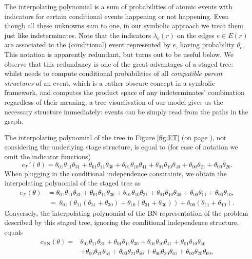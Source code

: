 {The interpolating polynomial is a sum of probabilities of atomic events with indicators for certain conditional events happening or not happening. Even though all these unknowns sum to one, in our symbolic approach we treat them just like indeterminates. Note that the indicators $\lambda_e(r)$ on the edges $e\in E(r)$ are associated to the (conditional) event represented by $e$, having probability $\theta_e$. This notation is apparently redundant, but turns out to be useful below. We observe that this redundancy is one of the great advantages of a staged tree: whilst \cite{Darwiche2003} needs to compute conditional probabilities of all \emph{compatible parent structures} of an event, which is a rather obscure concept in a symbolic framework, and \cite{Castillo1996a} computes the product space of any indeterminates' combination regardless of their meaning, a tree visualisation of our model gives us the necessary structure immediately: events can be simply read from the paths in the graph. 

\begin{example}
The interpolating polynomial of the tree in Figure \ref{fig:ET} (on page \pageref{riporto}), not considering the underlying stage structure, is equal to (for ease of notation we omit the indicator functions) 
\begin{equation}\label{eq:interpolstaged}
c_\mathcal{T}'(\theta)=\theta_{01}\theta_{11}\theta_{31}
+\theta_{01}\theta_{11}\theta_{30}
+\theta_{01}\theta_{10}\theta_{41}
+\theta_{01}\theta_{10}\theta_{40}
+\theta_{00}\theta_{21}
+\theta_{00}\theta_{20}.
\end{equation}
When plugging in the conditional independence constraints, we obtain the interpolating polynomial of the staged tree as
\begin{align}\label{eq:interpolceg}
c_\mathcal{T}(\theta)&=\theta_{01}\theta_{11}\theta_{31}
+\theta_{01}\theta_{11}\theta_{30}
+\theta_{01}\theta_{10}\theta_{31}
+\theta_{01}\theta_{10}\theta_{30}
+\theta_{00}\theta_{11}
+\theta_{00}\theta_{10},\\
&~=~\theta_{01}(\theta_{11}(\theta_{31}+\theta_{30})+\theta_{10}(\theta_{31}+\theta_{30}))+\theta_{00}(\theta_{11}+\theta_{10}).\label{eq:factored}
\end{align}
Conversely, the interpolating polynomial of the BN representation of the problem described by this staged tree, ignoring the conditional independence structure, equals 
\begin{equation}\label{eq:interpolBN}
\begin{split}
c_{\text{BN}}(\theta)=&
\theta_{01}\theta_{11}\theta_{31}
+\theta_{01}\theta_{11}\theta_{30}
+\theta_{01}\theta_{10}\theta_{41}
+\theta_{01}\theta_{10}\theta_{40}\\
&+\theta_{00}\theta_{21}\theta_{51}
+\theta_{00}\theta_{21}\theta_{50}
+\theta_{00}\theta_{20}\theta_{61}
+\theta_{00}\theta_{20}\theta_{60},
\end{split}
\end{equation}
\end{example}

}
